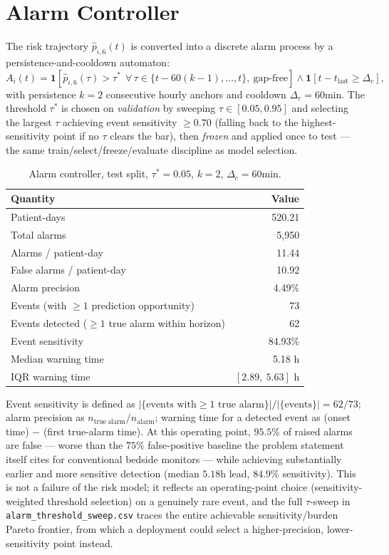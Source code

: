 \documentclass[11pt]{article}
\newcommand{\1}[1]{\mathbf{1}\!\left[#1\right]}
\begin{document}
\section{Alarm Controller}

The risk trajectory $\hat p_{i,6}(t)$ is converted into a discrete alarm process by a persistence-and-cooldown automaton:
\begin{equation}
A_i(t) = \1{\hat p_{i,6}(\tau) > \tau^\ast \ \ \forall\, \tau \in \{t-60(k-1),\dots,t\},\ \text{gap-free}} \wedge \1{t - t_{\mathrm{last}} \ge \Delta_c},
\end{equation}
with persistence $k=2$ consecutive hourly anchors and cooldown $\Delta_c=60$min. The threshold $\tau^\ast$ is chosen on \emph{validation} by sweeping $\tau\in[0.05,0.95]$ and selecting the largest $\tau$ achieving event sensitivity $\ge0.70$ (falling back to the highest-sensitivity point if no $\tau$ clears the bar), then \emph{frozen} and applied once to test — the same train/select/freeze/evaluate discipline as model selection.

\begin{table}[h]
\centering
\caption{Alarm controller, test split, $\tau^\ast=0.05$, $k=2$, $\Delta_c=60$min.}
\begin{tabular}{lr}
\toprule
Quantity & Value \\
\midrule
Patient-days & 520.21 \\
Total alarms & 5{,}950 \\
Alarms / patient-day & 11.44 \\
False alarms / patient-day & 10.92 \\
Alarm precision & 4.49\% \\
Events (with $\ge1$ prediction opportunity) & 73 \\
Events detected ($\ge1$ true alarm within horizon) & 62 \\
Event sensitivity & 84.93\% \\
Median warning time & 5.18 h \\
IQR warning time & $[2.89,\ 5.63]$ h \\
\bottomrule
\end{tabular}
\end{table}
\noindent Event sensitivity is defined as $\big|\{\text{events with} \ge1 \text{ true alarm}\}\big| / \big|\{\text{events}\}\big| = 62/73$; alarm precision as $n_{\mathrm{true\ alarm}}/n_{\mathrm{alarm}}$; warning time for a detected event as (onset time) $-$ (first true-alarm time). At this operating point, $95.5\%$ of raised alarms are false — worse than the $75\%$ false-positive baseline the problem statement itself cites for conventional bedside monitors — while achieving substantially earlier and more sensitive detection (median $5.18$h lead, $84.9\%$ sensitivity). This is not a failure of the risk model; it reflects an operating-point choice (sensitivity-weighted threshold selection) on a genuinely rare event, and the full $\tau$-sweep in \texttt{alarm\_threshold\_sweep.csv} traces the entire achievable sensitivity/burden Pareto frontier, from which a deployment could select a higher-precision, lower-sensitivity point instead.
\end{document}
